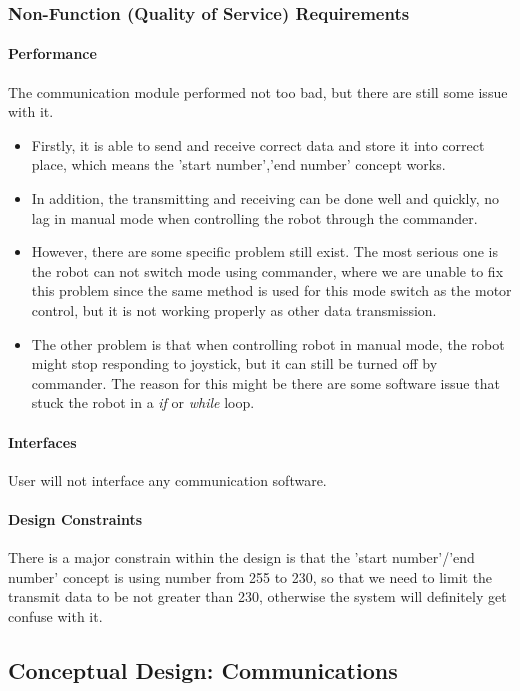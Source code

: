 \documentclass[MTRX3700report.tex]{subfiles}
\begin{document}
\subsubsection{Non-Function (Quality of Service) Requirements}

\paragraph{Performance}
The communication module performed not too bad, but there are still some issue with it. 
\begin{itemize}
\item Firstly, it is able to send and receive correct data and store it into correct place, which means the 'start number','end number' concept works.
\item In addition, the transmitting and receiving can be done well and quickly, no lag in manual mode when controlling the robot through the commander.
\item	However, there are some specific problem still exist. The most serious one is the robot can not switch mode using commander, where we are unable to fix this problem since the same method is used for this mode switch as the motor control, but it is not working properly as other data transmission. 
\item The other problem is that when controlling robot in manual mode, the robot might stop responding to joystick, but it can still be turned off by commander. The reason for this might be there are some software issue that stuck the robot in a \textit{if} or \textit{while} loop.
\end{itemize}

\paragraph{Interfaces}
User will not interface any communication software.
\paragraph{Design Constraints}
There is a major constrain within the design is that the 'start number'/'end number' concept is using number from 255 to 230, so that we need to limit the transmit data to be not greater than 230, otherwise the system will definitely get confuse with it.

\subsection{Conceptual Design: Communications}
\end{document}
